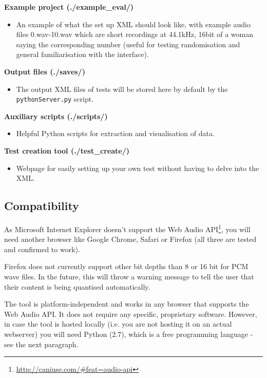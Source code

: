 \documentclass[11pt, oneside]{article}   	%
\begin{document}
         \textbf{Example project (./example\_eval/)}
            	\begin{itemize}
            		\item An example of what the set up XML should look like, with example audio files 0.wav-10.wav which are short recordings at 44.1kHz, 16bit of a woman saying the corresponding number (useful for testing randomisation and general familiarisation with the interface).\\ 
            	\end{itemize}
          \textbf{Output files (./saves/)}
            	\begin{itemize}
            		\item The output XML files of tests will be stored here by default by the \texttt{pythonServer.py} script.\\ 
            	\end{itemize}
          \textbf{Auxiliary scripts (./scripts/)}
            	\begin{itemize}
            		\item Helpful Python scripts for extraction and visualisation of data.\\ 
            	\end{itemize}
          \textbf{Test creation tool (./test\_create/)}
            	\begin{itemize}
            		\item Webpage for easily setting up your own test without having to delve into the XML.\\ 
            	\end{itemize}
                    	
	\subsection{Compatibility}
		As Microsoft Internet Explorer doesn't support the Web Audio API\footnote{\url{http://caniuse.com/\#feat=audio-api}}, you will need another browser like Google Chrome, Safari or Firefox (all three are tested and confirmed to work). 

		Firefox does not currently support other bit depths than 8 or 16 bit for PCM wave files. In the future, this will throw a warning message to tell the user that their content is being quantised automatically. %
		
		The tool is platform-independent and works in any browser that supports the Web Audio API. It does not require any specific, proprietary software. However, in case the tool is hosted locally (i.e. you are not hosting it on an actual webserver) you will need Python (2.7), which is a free programming language - see the next paragraph. 
	
\end{document}
